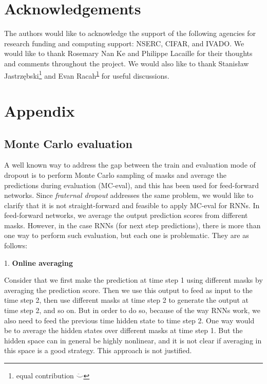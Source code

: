 \documentclass{article} \usepackage{iclr2018_conference,times}
\begin{document}
\ificlrfinal
\section*{Acknowledgements}
\setcounter{footnote}{1}
\def\thefootnote{\fnsymbol{footnote}}
The authors would like to acknowledge the support of the following agencies for research funding and computing support: NSERC, CIFAR, and IVADO. We would like to thank Rosemary Nan Ke and Philippe Lacaille for their thoughts and comments throughout the project. We would also like to thank Stanis\l{}aw Jastrz\k{e}bski\footnote{\label{eq_con}equal contribution $\ddot\smile$} and Evan Racah\textsuperscript{\ref{eq_con}} for useful discussions.
\fi




\newpage
\appendix

\section*{Appendix}
\subsection*{Monte Carlo evaluation}

A well known way to address the gap between the train and evaluation mode of dropout is to perform Monte Carlo sampling of masks and average the predictions during evaluation (MC-eval), and this has been used for feed-forward networks. Since \emph{fraternal dropout} addresses the same problem, we would like to clarify that it is not straight-forward and feasible to apply MC-eval for RNNs. In feed-forward networks, we average the output prediction scores from different masks. However, in the case RNNs (for next step predictions), there is more than one way to perform such evaluation, but each one is problematic. They are as follows:

1. \textbf{Online averaging}

Consider that we first make the prediction at time step 1 using different masks by averaging the prediction score. Then we use this output to feed as input to the time step 2, then use different masks at time step 2 to generate the output at time step 2, and so on. But in order to do so, because of the way RNNs work, we also need to feed the previous time hidden state to time step 2. One way would be to average the hidden states over different masks at time step 1. But the hidden space can in general be highly nonlinear, and it is not clear if averaging in this space is a good strategy. This approach is not justified.
\end{document}
